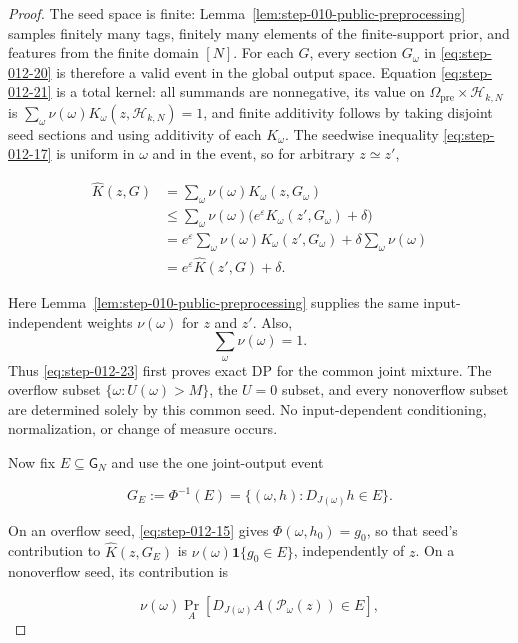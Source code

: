 \begin{proof}
The seed space is finite: Lemma~\ref{lem:step-010-public-preprocessing}
samples finitely many tags,
finitely many elements of the finite-support prior, and features from the
finite domain \([N]\).  For each \(G\), every section \(G_\omega\) in
\eqref{eq:step-012-20} is therefore a valid event in the global output space.  Equation
\eqref{eq:step-012-21} is a total kernel: all summands are nonnegative, its value on
\(\mathsf\Omega_{\mathrm{pre}}\times\mathcal H_{k,N}\) is
\(\sum_\omega\nu(\omega)K_\omega(z,\mathcal H_{k,N})=1\), and finite
additivity follows by taking disjoint seed sections and using additivity of
each \(K_\omega\).  The seedwise inequality \eqref{eq:step-012-17} is uniform in \(\omega\)
and in the event, so for arbitrary \(z\simeq z'\),

\[
\begin{aligned}
  \widehat K(z,G)
  &=\sum_\omega\nu(\omega)K_\omega(z,G_\omega)\\
  &\le\sum_\omega\nu(\omega)
       \bigl(e^\varepsilon K_\omega(z',G_\omega)+\delta\bigr)\\
  &=e^\varepsilon\sum_\omega\nu(\omega)K_\omega(z',G_\omega)
    +\delta\sum_\omega\nu(\omega)\\
  &=e^\varepsilon\widehat K(z',G)+\delta.
\end{aligned}
\tag{S12.23}\label{eq:step-012-23}
\]

Here Lemma~\ref{lem:step-010-public-preprocessing} supplies the
same input-independent weights \(\nu(\omega)\) for \(z\) and \(z'\).  Also,
\[
\sum_\omega\nu(\omega)=1.
\]
Thus \eqref{eq:step-012-23} first proves exact DP for the
common joint mixture.  The overflow subset
\(\{\omega:U(\omega)>M\}\), the \(U=0\) subset, and every nonoverflow
subset are determined solely by this common seed.  No input-dependent
conditioning, normalization, or change of measure occurs.

Now fix \(E\subseteq\mathsf G_N\) and use the one joint-output event

\[
  G_E:=\Phi^{-1}(E)
  =\{(\omega,h):D_{J(\omega)}h\in E\}.
\tag{S12.24}\label{eq:step-012-24}
\]

On an overflow seed, \eqref{eq:step-012-15} gives \(\Phi(\omega,h_0)=g_0\), so that seed's
contribution to \(\widehat K(z,G_E)\) is
\(\nu(\omega)\mathbf1\{g_0\in E\}\), independently of \(z\).  On a
nonoverflow seed, its contribution is

\[
  \nu(\omega)\Pr_A\!\left[
    D_{J(\omega)}A(\mathcal P_\omega(z))\in E
  \right],
\tag{S12.25}\label{eq:step-012-25}
\]


\end{proof}
